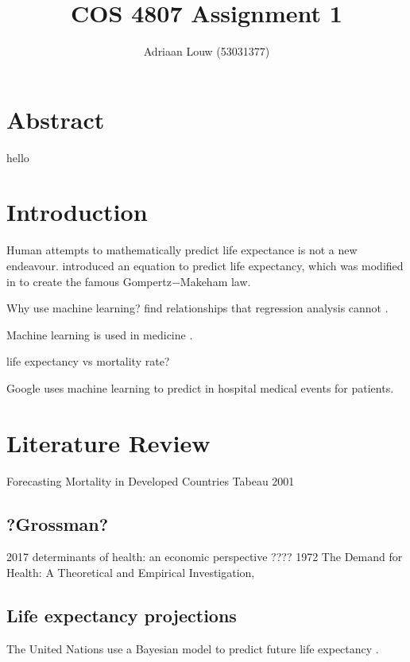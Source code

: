 \documentclass[10pt,a4paper]{article}
\title{COS 4807 Assignment 1}
\author{Adriaan Louw (53031377)}
\begin{document}
\maketitle

\tableofcontents

\listoffigures

\listoftables


\section{Abstract}
hello
\section{Introduction}

Human attempts to mathematically predict life expectance is not a new endeavour. \cite{Gompertz} introduced an equation to predict life expectancy, which was modified in \cite{Makeham1860} to create the famous Gompertz$-$Makeham law.


Why use machine learning? find relationships that regression analysis cannot \cite{Chen2017}.

Machine learning is used in medicine \cite{Chen2017}.

life expectancy vs mortality rate?

\cite{Rajkomar2018} Google uses machine learning to predict in hospital medical events for patients. 

\section{Literature Review}

Forecasting Mortality in Developed Countries Tabeau 2001

\subsection{?Grossman?}
2017 determinants of health: an economic perspective  ????
1972 The Demand for Health: A Theoretical and Empirical Investigation,

\cite{Grossman2000}

\subsection{Life expectancy projections}

The United Nations use a Bayesian model to predict future life expectancy \citep{Raftery2014}.
\end{document}

